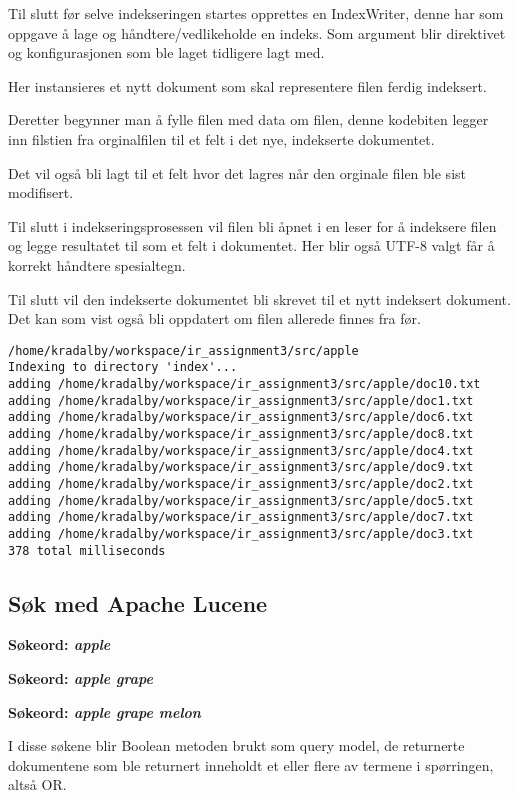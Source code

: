
Til slutt før selve indekseringen startes opprettes en IndexWriter, denne har som oppgave å lage og håndtere/vedlikeholde en indeks. Som argument blir direktivet og konfigurasjonen som ble laget tidligere lagt med.


Her instansieres et nytt dokument som skal representere filen ferdig indeksert.


Deretter begynner man å fylle filen med data om filen, denne kodebiten legger inn filstien fra orginalfilen til et felt i det nye, indekserte dokumentet. 


Det vil også bli lagt til et felt hvor det lagres når den orginale filen ble sist modifisert.


Til slutt i indekseringsprosessen vil filen bli åpnet i en leser for å indeksere filen og legge resultatet til som et felt i dokumentet. Her blir også UTF-8 valgt får å korrekt håndtere spesialtegn.

Til slutt vil den indekserte dokumentet bli skrevet til et nytt indeksert dokument. Det kan som vist også bli oppdatert om filen allerede finnes fra før.


\begin{lstlisting}[frame=single]  % Start your code-block
/home/kradalby/workspace/ir_assignment3/src/apple
Indexing to directory 'index'...
adding /home/kradalby/workspace/ir_assignment3/src/apple/doc10.txt
adding /home/kradalby/workspace/ir_assignment3/src/apple/doc1.txt
adding /home/kradalby/workspace/ir_assignment3/src/apple/doc6.txt
adding /home/kradalby/workspace/ir_assignment3/src/apple/doc8.txt
adding /home/kradalby/workspace/ir_assignment3/src/apple/doc4.txt
adding /home/kradalby/workspace/ir_assignment3/src/apple/doc9.txt
adding /home/kradalby/workspace/ir_assignment3/src/apple/doc2.txt
adding /home/kradalby/workspace/ir_assignment3/src/apple/doc5.txt
adding /home/kradalby/workspace/ir_assignment3/src/apple/doc7.txt
adding /home/kradalby/workspace/ir_assignment3/src/apple/doc3.txt
378 total milliseconds
\end{lstlisting}
\pagebreak
\subsection*{Søk med Apache Lucene}
\noindent \textbf{Søkeord: \textit{apple}}

\noindent \textbf{Søkeord: \textit{apple grape}}

\noindent \textbf{Søkeord: \textit{apple grape melon}}


I disse søkene blir Boolean metoden brukt som query model, de returnerte dokumentene som ble returnert inneholdt et eller flere av termene i spørringen, altså OR.

